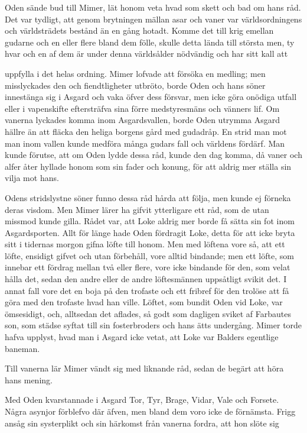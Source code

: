 
Oden sände bud till Mimer, lät honom veta hvad som skett och bad om hans
råd. Det var tydligt, att genom brytningen mällan asar och vaner var
världsordningens och världsträdets bestånd än en gång hotadt. Komme det
till krig emellan gudarne och en eller flere bland dem fölle, skulle
detta lända till största men, ty hvar och en af dem är under denna
världsålder nödvändig och har sitt kall att

uppfylla i det helas ordning. Mimer lofvade att försöka en medling; men
misslyckades den och fiendtligheter utbröto, borde Oden och hans söner
innestänga sig i Asgard och vaka öfver dess försvar, men icke göra
onödiga utfall eller i vapenskifte eftersträfva sina förre medstyresmäns
och vänners lif. Om vanerna lyckades komma inom Asgardsvallen, borde
Oden utrymma Asgard hällre än att fläcka den heliga borgens gård med
gudadråp. En strid man mot man inom vallen kunde medföra många gudars
fall och världens fördärf. Man kunde förutse, att om Oden lydde dessa
råd, kunde den dag komma, då vaner och alfer åter hyllade honom som sin
fader och konung, för att aldrig mer ställa sin vilja mot hans.

Odens stridslystne söner funno dessa råd hårda att följa, men kunde ej
förneka deras visdom. Men Mimer lärer ha gifvit ytterligare ett råd, som
de utan missmod kunde gilla. Rådet var, att Loke aldrig mer borde få
sätta sin fot inom Asgardsporten. Allt för länge hade Oden fördragit
Loke, detta för att icke bryta sitt i tidernas morgon gifna löfte till
honom. Men med löftena vore så, att ett löfte, ensidigt gifvet och utan
förbehåll, vore alltid bindande; men ett löfte, som innebar ett fördrag
mellan två eller flere, vore icke bindande för den, som velat hålla det,
sedan den andre eller de andre löftesmännen uppsåtligt svikit det. I
annat fall vore det en boja på den trofaste och ett fribref för den
trolöse att få göra med den trofaste hvad han ville. Löftet, som bundit
Oden vid Loke, var ömsesidigt, och, alltsedan det aflades, så godt som
dagligen sviket af Farbautes son, som städse syftat till sin
fosterbroders och hans ätts undergång. Mimer torde hafva upplyst, hvad
man i Asgard icke vetat, att Loke var Balders egentlige baneman.

Till vanerna lär Mimer vändt sig med liknande råd, sedan de begärt att
höra hans mening.

Med Oden kvarstannade i Asgard Tor, Tyr, Brage, Vidar, Vale och Forsete.
Några asynjor förblefvo där äfven, men bland dem voro icke de förnämsta.
Frigg ansåg sin systerplikt och sin härkomst från vanerna fordra, att
hon slöte sig

